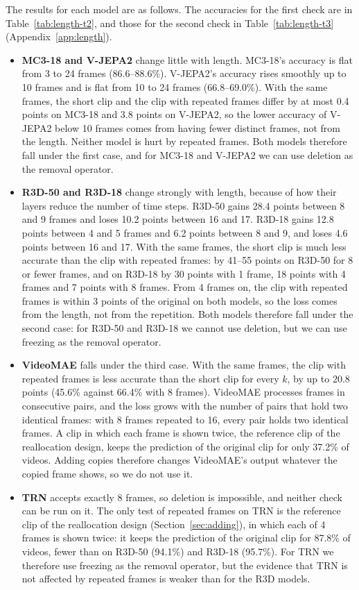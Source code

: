 The results for each model are as follows. The accuracies for the first check are in Table~\ref{tab:length-t2}, and those for the second check in Table~\ref{tab:length-t3} (Appendix~\ref{app:length}).
\begin{itemize}
  \item \textbf{MC3-18 and V-JEPA2} change little with length. MC3-18's accuracy is flat from 3 to 24 frames (86.6--88.6\%). V-JEPA2's accuracy rises smoothly up to 10 frames and is flat from 10 to 24 frames (66.8--69.0\%). With the same frames, the short clip and the clip with repeated frames differ by at most 0.4 points on MC3-18 and 3.8 points on V-JEPA2, so the lower accuracy of V-JEPA2 below 10 frames comes from having fewer distinct frames, not from the length. Neither model is hurt by repeated frames. Both models therefore fall under the first case, and for MC3-18 and V-JEPA2 we can use deletion as the removal operator.
  \item \textbf{R3D-50 and R3D-18} change strongly with length, because of how their layers reduce the number of time steps. R3D-50 gains 28.4 points between 8 and 9 frames and loses 10.2 points between 16 and 17. R3D-18 gains 12.8 points between 4 and 5 frames and 6.2 points between 8 and 9, and loses 4.6 points between 16 and 17. With the same frames, the short clip is much less accurate than the clip with repeated frames: by 41--55 points on R3D-50 for 8 or fewer frames, and on R3D-18 by 30 points with 1 frame, 18 points with 4 frames and 7 points with 8 frames. From 4 frames on, the clip with repeated frames is within 3 points of the original on both models, so the loss comes from the length, not from the repetition. Both models therefore fall under the second case: for R3D-50 and R3D-18 we cannot use deletion, but we can use freezing as the removal operator.
  \item \textbf{VideoMAE} falls under the third case. With the same frames, the clip with repeated frames is less accurate than the short clip for every $k$, by up to 20.8 points (45.6\% against 66.4\% with 8 frames). VideoMAE processes frames in consecutive pairs, and the loss grows with the number of pairs that hold two identical frames: with 8 frames repeated to 16, every pair holds two identical frames. A clip in which each frame is shown twice, the reference clip of the reallocation design, keeps the prediction of the original clip for only 37.2\% of videos. Adding copies therefore changes VideoMAE's output whatever the copied frame shows, so we do not use it.
  \item \textbf{TRN} accepts exactly 8 frames, so deletion is impossible, and neither check can be run on it. The only test of repeated frames on TRN is the reference clip of the reallocation design (Section~\ref{sec:adding}), in which each of 4 frames is shown twice: it keeps the prediction of the original clip for 87.8\% of videos, fewer than on R3D-50 (94.1\%) and R3D-18 (95.7\%). For TRN we therefore use freezing as the removal operator, but the evidence that TRN is not affected by repeated frames is weaker than for the R3D models.
\end{itemize}
